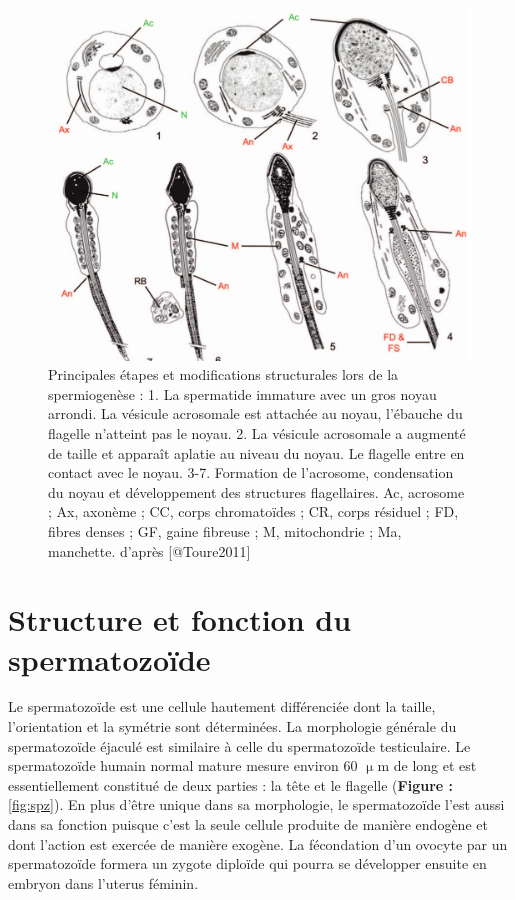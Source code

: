 \documentclass[12pt,twoside]{reedthesis}
\theoremstyle{definition}
\theoremstyle{definition}
\theoremstyle{remark}
\begin{document}
  \begin{figure}
  
  {\centering \includegraphics[scale=0.3]{figure/spermiogenese} 
  
  }
  
  \caption[Principales étapes et modifications structurales lors de la spermiogenèse]{Principales étapes et modifications structurales lors de la spermiogenèse : 1. La spermatide immature avec un gros noyau arrondi. La vésicule acrosomale est attachée au noyau, l’ébauche du flagelle n’atteint pas le noyau. 2. La vésicule acrosomale a augmenté de taille et apparaît aplatie au niveau du noyau. Le flagelle entre en contact avec le noyau. 3-7. Formation de l’acrosome, condensation du noyau et développement des structures flagellaires. Ac, acrosome ; Ax, axonème ; CC, corps chromatoïdes ; CR, corps résiduel ; FD, fibres denses ; GF, gaine fibreuse ; M, mitochondrie ; Ma, manchette. d'après [@Toure2011]}\label{fig:spermiogenese}
  \end{figure}
  
  \newpage  
  
  \section{Structure et fonction du
  spermatozoïde}\label{structure-et-fonction-du-spermatozoide}
  
  Le spermatozoïde est une cellule hautement différenciée dont la taille,
  l'orientation et la symétrie sont déterminées. La morphologie générale
  du spermatozoïde éjaculé est similaire à celle du spermatozoïde
  testiculaire. Le spermatozoïde humain normal mature mesure environ 60
  \(\upmu\)m de long et est essentiellement constitué de deux parties : la
  tête et le flagelle (\textbf{Figure : }\ref{fig:spz}). En plus d'être
  unique dans sa morphologie, le spermatozoïde l'est aussi dans sa
  fonction puisque c'est la seule cellule produite de manière endogène et
  dont l'action est exercée de manière exogène. La fécondation d'un
  ovocyte par un spermatozoïde formera un zygote diploïde qui pourra se
  développer ensuite en embryon dans l'uterus féminin.
  
\end{document}
